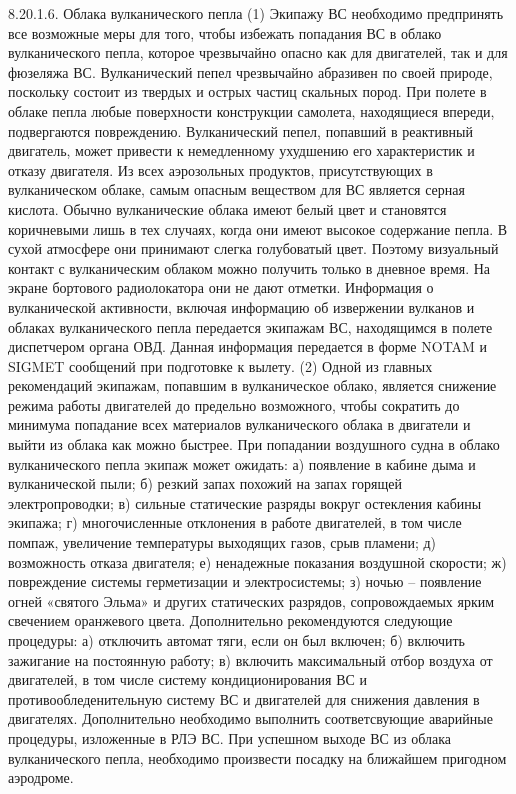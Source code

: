 8.20.1.6.	Облака вулканического пепла
(1) Экипажу ВС необходимо предпринять все возможные меры для того, чтобы избежать попадания ВС в облако вулканического пепла, которое чрезвычайно опасно как для двигателей, так и для фюзеляжа ВС.
Вулканический пепел чрезвычайно абразивен по своей природе, поскольку состоит из твердых и острых частиц скальных пород. При полете в облаке пепла любые поверхности конструкции самолета, находящиеся впереди, подвергаются повреждению.
Вулканический пепел, попавший в реактивный двигатель, может привести к немедленному ухудшению его характеристик и отказу двигателя.
Из всех аэрозольных продуктов, присутствующих в вулканическом облаке, самым опасным веществом для ВС является серная кислота.
Обычно вулканические облака имеют белый цвет и становятся коричневыми лишь в тех случаях, когда они имеют высокое содержание пепла. В сухой атмосфере они принимают слегка голубоватый цвет. Поэтому визуальный контакт с вулканическим облаком можно получить только в дневное время. На экране бортового радиолокатора они не дают отметки.
Информация о вулканической активности, включая информацию об извержении вулканов и облаках вулканического пепла передается экипажам ВС, находящимся в полете диспетчером органа ОВД. Данная информация передается в форме NOTAM и SIGMET сообщений при подготовке к вылету.
(2) Одной из главных рекомендаций экипажам, попавшим в вулканическое облако, является снижение режима работы двигателей до предельно возможного, чтобы сократить до минимума попадание всех материалов вулканического облака в двигатели и выйти из облака как можно быстрее.
При попадании воздушного судна в облако вулканического пепла экипаж может ожидать:
а)	появление в кабине дыма и вулканической пыли;
б)	резкий запах похожий на запах горящей электропроводки;
в)	сильные статические разряды вокруг остекления кабины экипажа;
г)	многочисленные отклонения в работе двигателей, в том числе помпаж, увеличение температуры выходящих газов, срыв пламени;
д)	возможность отказа двигателя;
е)	ненадежные показания воздушной скорости;
ж)	повреждение системы герметизации и электросистемы;
з)	ночью – появление огней «святого Эльма» и других статических разрядов, сопровождаемых ярким свечением оранжевого цвета.
Дополнительно рекомендуются следующие процедуры:
а)	отключить автомат тяги, если он был включен;
б)	включить зажигание на постоянную работу;
в)	включить максимальный отбор воздуха от двигателей, в том числе систему кондиционирования ВС и противообледенительную систему ВС и двигателей для снижения давления в двигателях.
Дополнительно необходимо выполнить соответсвующие аварийные процедуры, изложенные в РЛЭ ВС. При успешном выходе ВС из облака вулканического пепла, необходимо произвести посадку на ближайшем пригодном аэродроме.
